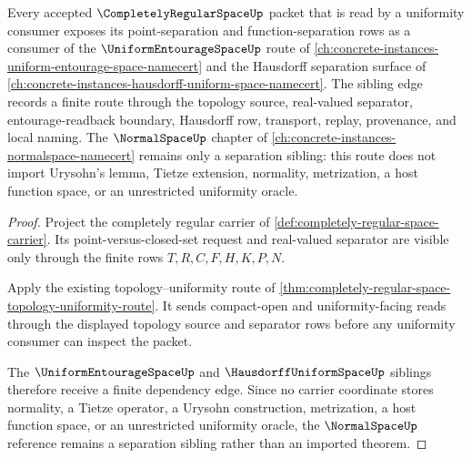 \begin{theorem}
\label{thm:completely-regular-space-uniformity-sibling-route}
Every accepted $\CompletelyRegularSpaceUp$ packet that is read by a uniformity consumer exposes its point-separation and function-separation rows as a consumer of the $\UniformEntourageSpaceUp$ route of \autoref{ch:concrete-instances-uniform-entourage-space-namecert} and the Hausdorff separation surface of \autoref{ch:concrete-instances-hausdorff-uniform-space-namecert}. The sibling edge records a finite route through the topology source, real-valued separator, entourage-readback boundary, Hausdorff row, transport, replay, provenance, and local naming. The $\NormalSpaceUp$ chapter of \autoref{ch:concrete-instances-normalspace-namecert} remains only a separation sibling: this route does not import Urysohn's lemma, Tietze extension, normality, metrization, a host function space, or an unrestricted uniformity oracle.
\end{theorem}
\begin{proof}
Project the completely regular carrier of \autoref{def:completely-regular-space-carrier}. Its point-versus-closed-set request and real-valued separator are visible only through the finite rows $T,R,C,F,H,K,P,N$.

Apply the existing topology--uniformity route of \autoref{thm:completely-regular-space-topology-uniformity-route}. It sends compact-open and uniformity-facing reads through the displayed topology source and separator rows before any uniformity consumer can inspect the packet.

The $\UniformEntourageSpaceUp$ and $\HausdorffUniformSpaceUp$ siblings therefore receive a finite dependency edge. Since no carrier coordinate stores normality, a Tietze operator, a Urysohn construction, metrization, a host function space, or an unrestricted uniformity oracle, the $\NormalSpaceUp$ reference remains a separation sibling rather than an imported theorem.
\end{proof}
